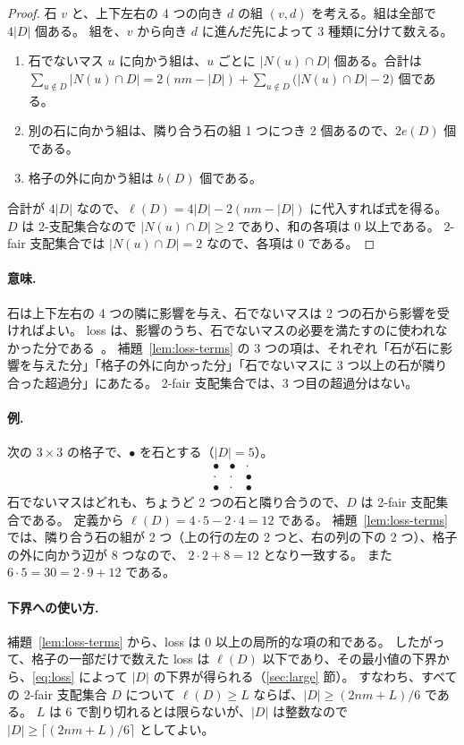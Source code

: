 \documentclass[11pt]{ltjsarticle}
\theoremstyle{definition}
\begin{document}
\begin{proof}
石 $v$ と、上下左右の 4 つの向き $d$ の組 $(v,d)$ を考える。組は全部で $4|D|$ 個ある。
組を、$v$ から向き $d$ に進んだ先によって 3 種類に分けて数える。
\begin{enumerate}
\item 石でないマス $u$ に向かう組は、$u$ ごとに $|N(u)\cap D|$ 個ある。合計は
  $\sum_{u\notin D}|N(u)\cap D| = 2(nm-|D|)+\sum_{u\notin D}\bigl(|N(u)\cap D|-2\bigr)$ 個である。
\item 別の石に向かう組は、隣り合う石の組 1 つにつき 2 個あるので、$2e(D)$ 個である。
\item 格子の外に向かう組は $b(D)$ 個である。
\end{enumerate}
合計が $4|D|$ なので、$\ell(D)=4|D|-2(nm-|D|)$ に代入すれば式を得る。
$D$ は 2-支配集合なので $|N(u)\cap D|\ge 2$ であり、和の各項は $0$ 以上である。
2-fair 支配集合では $|N(u)\cap D|=2$ なので、各項は $0$ である。
\end{proof}

\paragraph{意味.}
石は上下左右の 4 つの隣に影響を与え、石でないマスは 2 つの石から影響を受ければよい。
loss は、影響のうち、石でないマスの必要を満たすのに使われなかった分である~\cite{GPRT,RT}。
補題~\ref{lem:loss-terms} の 3 つの項は、それぞれ「石が石に影響を与えた分」「格子の外に向かった分」「石でないマスに 3 つ以上の石が隣り合った超過分」にあたる。
2-fair 支配集合では、3 つ目の超過分はない。

\paragraph{例.}
次の $3\times 3$ の格子で、$\bullet$ を石とする（$|D|=5$）。
\[
\begin{array}{ccc}
\bullet & \bullet & \cdot\\
\cdot & \cdot & \bullet\\
\bullet & \cdot & \bullet
\end{array}
\]
石でないマスはどれも、ちょうど 2 つの石と隣り合うので、$D$ は 2-fair 支配集合である。
定義から $\ell(D)=4\cdot 5-2\cdot 4=12$ である。
補題~\ref{lem:loss-terms} では、隣り合う石の組が 2 つ（上の行の左の 2 つと、右の列の下の 2 つ）、格子の外に向かう辺が 8 つなので、
$2\cdot 2+8=12$ となり一致する。
また $6\cdot 5=30=2\cdot 9+12$ である。

\paragraph{下界への使い方.}
補題~\ref{lem:loss-terms} から、loss は 0 以上の局所的な項の和である。
したがって、格子の一部だけで数えた loss は $\ell(D)$ 以下であり、その最小値の下界から、\eqref{eq:loss} によって $|D|$ の下界が得られる（\ref{sec:large} 節）。
すなわち、すべての 2-fair 支配集合 $D$ について $\ell(D)\ge L$ ならば、$|D|\ge (2nm+L)/6$ である。
$L$ は 6 で割り切れるとは限らないが、$|D|$ は整数なので $|D|\ge\lceil (2nm+L)/6\rceil$ としてよい。
\end{document}
